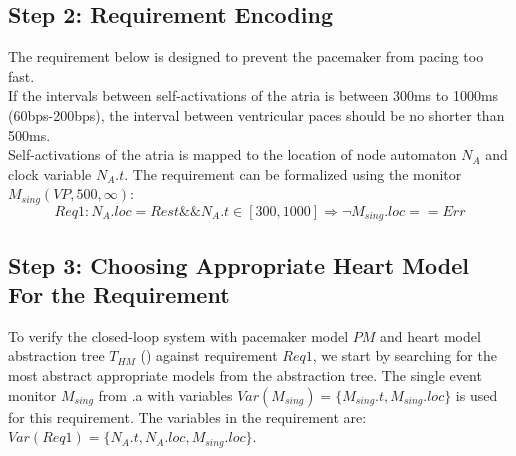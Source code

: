 \subsection{Step 2: Requirement Encoding}
The requirement below is designed to prevent the pacemaker from pacing too fast.\\
\textsf{If the intervals between self-activations of the atria is between 300ms to 1000ms (60bps-200bps), the interval between ventricular paces should be no shorter than 500ms.}\\
Self-activations of the atria is mapped to the location of node automaton $N_A$ and clock variable $N_A.t$.
The requirement can be formalized using the monitor  $M_{sing}(VP,500,\infty)$:
\[Req1: N_A.loc=Rest \&\& N_A.t\in [300,1000] \Rightarrow \neg M_{sing}.loc==Err\]
%
 \subsection{Step 3: Choosing Appropriate Heart Model For the Requirement}
To verify the closed-loop system with pacemaker model $PM$ and heart model abstraction tree $T_{HM}$ () against requirement $Req1$, we start by searching for the most abstract appropriate models from the abstraction tree. The single event monitor $M_{sing}$ from .a with variables $Var(M_{sing})=\{M_{sing}.t,M_{sing}.loc\}$ is used for this requirement. The variables in the requirement are:
$Var(Req1)=\{N_A.t,N_A.loc,M_{sing}.loc\}$.

